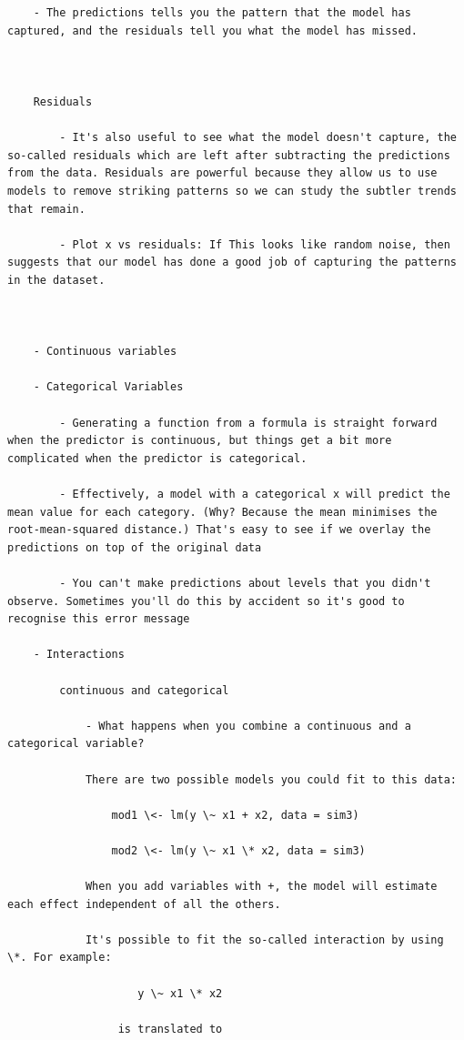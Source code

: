 \documentclass[
]{book}
\begin{document}
\begin{verbatim}
    - The predictions tells you the pattern that the model has captured, and the residuals tell you what the model has missed.



    Residuals

        - It's also useful to see what the model doesn't capture, the so-called residuals which are left after subtracting the predictions from the data. Residuals are powerful because they allow us to use models to remove striking patterns so we can study the subtler trends that remain.

        - Plot x vs residuals: If This looks like random noise, then suggests that our model has done a good job of capturing the patterns in the dataset.



    - Continuous variables

    - Categorical Variables

        - Generating a function from a formula is straight forward when the predictor is continuous, but things get a bit more complicated when the predictor is categorical.

        - Effectively, a model with a categorical x will predict the mean value for each category. (Why? Because the mean minimises the root-mean-squared distance.) That's easy to see if we overlay the predictions on top of the original data

        - You can't make predictions about levels that you didn't observe. Sometimes you'll do this by accident so it's good to recognise this error message

    - Interactions

        continuous and categorical

            - What happens when you combine a continuous and a categorical variable?

            There are two possible models you could fit to this data:

                mod1 \<- lm(y \~ x1 + x2, data = sim3)

                mod2 \<- lm(y \~ x1 \* x2, data = sim3)

            When you add variables with +, the model will estimate each effect independent of all the others.

            It's possible to fit the so-called interaction by using \*. For example:

                    y \~ x1 \* x2

                 is translated to


\end{verbatim}
\end{document}
